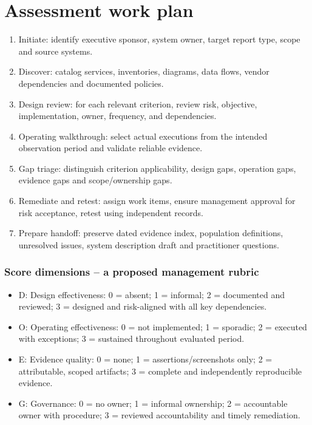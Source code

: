 \documentclass[10pt,oneside]{report}
\begin{document}
\chapter{Assessment work plan}
\begin{enumerate}
\item Initiate: identify executive sponsor, system owner, target report type, scope and source systems.
\item Discover: catalog services, inventories, diagrams, data flows, vendor dependencies and documented policies.
\item Design review: for each relevant criterion, review risk, objective, implementation, owner, frequency, and dependencies.
\item Operating walkthrough: select actual executions from the intended observation period and validate reliable evidence.
\item Gap triage: distinguish criterion applicability, design gaps, operation gaps, evidence gaps and scope/ownership gaps.
\item Remediate and retest: assign work items, ensure management approval for risk acceptance, retest using independent records.
\item Prepare handoff: preserve dated evidence index, population definitions, unresolved issues, system description draft and practitioner questions.
\end{enumerate}

\subsection{Score dimensions -- a proposed management rubric}
\begin{itemize}
\item D: Design effectiveness: 0 = absent; 1 = informal; 2 = documented and reviewed; 3 = designed and risk-aligned with all key dependencies.
\item O: Operating effectiveness: 0 = not implemented; 1 = sporadic; 2 = executed with exceptions; 3 = sustained throughout evaluated period.
\item E: Evidence quality: 0 = none; 1 = assertions/screenshots only; 2 = attributable, scoped artifacts; 3 = complete and independently reproducible evidence.
\item G: Governance: 0 = no owner; 1 = informal ownership; 2 = accountable owner with procedure; 3 = reviewed accountability and timely remediation.
\end{itemize}
\end{document}
